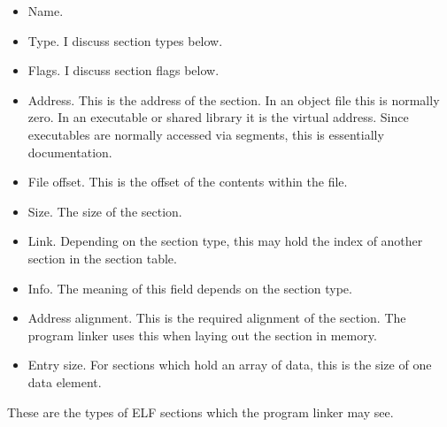 \begin{itemize}
    \item Name.

    \item Type.  I discuss section types below.

    \item Flags.  I discuss section flags below.

    \item Address.  This is the address of the section.  In an object file this
          is normally zero.  In an executable or shared library it is the
          virtual address.  Since executables are normally accessed via
          segments, this is essentially documentation.

    \item File offset.  This is the offset of the contents within the file.

    \item Size.  The size of the section.

    \item Link.  Depending on the section type, this may hold the index of
          another section in the section table.

    \item Info.  The meaning of this field depends on the section type.

    \item Address alignment.  This is the required alignment of the section.
          The program linker uses this when laying out the section in memory.

    \item Entry size.  For sections which hold an array of data, this is the
          size of one data element.
\end{itemize}

These are the types of ELF sections which the program linker may see.


